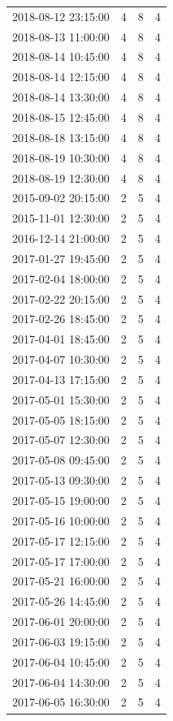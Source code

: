 \begin{tabular}{lrrr}
2018-08-12 23:15:00 & 4 & 8 & 4 \\
2018-08-13 11:00:00 & 4 & 8 & 4 \\
2018-08-14 10:45:00 & 4 & 8 & 4 \\
2018-08-14 12:15:00 & 4 & 8 & 4 \\
2018-08-14 13:30:00 & 4 & 8 & 4 \\
2018-08-15 12:45:00 & 4 & 8 & 4 \\
2018-08-18 13:15:00 & 4 & 8 & 4 \\
2018-08-19 10:30:00 & 4 & 8 & 4 \\
2018-08-19 12:30:00 & 4 & 8 & 4 \\
2015-09-02 20:15:00 & 2 & 5 & 4 \\
2015-11-01 12:30:00 & 2 & 5 & 4 \\
2016-12-14 21:00:00 & 2 & 5 & 4 \\
2017-01-27 19:45:00 & 2 & 5 & 4 \\
2017-02-04 18:00:00 & 2 & 5 & 4 \\
2017-02-22 20:15:00 & 2 & 5 & 4 \\
2017-02-26 18:45:00 & 2 & 5 & 4 \\
2017-04-01 18:45:00 & 2 & 5 & 4 \\
2017-04-07 10:30:00 & 2 & 5 & 4 \\
2017-04-13 17:15:00 & 2 & 5 & 4 \\
2017-05-01 15:30:00 & 2 & 5 & 4 \\
2017-05-05 18:15:00 & 2 & 5 & 4 \\
2017-05-07 12:30:00 & 2 & 5 & 4 \\
2017-05-08 09:45:00 & 2 & 5 & 4 \\
2017-05-13 09:30:00 & 2 & 5 & 4 \\
2017-05-15 19:00:00 & 2 & 5 & 4 \\
2017-05-16 10:00:00 & 2 & 5 & 4 \\
2017-05-17 12:15:00 & 2 & 5 & 4 \\
2017-05-17 17:00:00 & 2 & 5 & 4 \\
2017-05-21 16:00:00 & 2 & 5 & 4 \\
2017-05-26 14:45:00 & 2 & 5 & 4 \\
2017-06-01 20:00:00 & 2 & 5 & 4 \\
2017-06-03 19:15:00 & 2 & 5 & 4 \\
2017-06-04 10:45:00 & 2 & 5 & 4 \\
2017-06-04 14:30:00 & 2 & 5 & 4 \\
2017-06-05 16:30:00 & 2 & 5 & 4 \\

\end{tabular}
